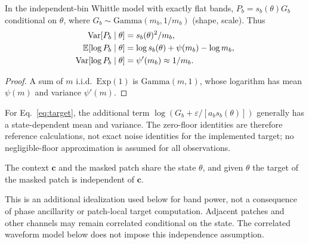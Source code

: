 \begin{proposition}\label{prop:var}
In the independent-bin Whittle model with exactly flat bands,
$P_b=s_b(\theta)G_b$ conditional on $\theta$, where
$G_b\sim\mathrm{Gamma}(m_b,1/m_b)$ (shape, scale). Thus
\begin{align*}
\operatorname{Var}[P_b\mid\theta]&=s_b(\theta)^2/m_b,\\
\mathbb{E}[\log P_b\mid\theta]&=\log s_b(\theta)+\psi(m_b)-\log m_b,\\
\operatorname{Var}[\log P_b\mid\theta]&=\psi'(m_b)\approx1/m_b.
\end{align*}
\end{proposition}
\begin{proof}
A sum of $m$ i.i.d.\ $\mathrm{Exp}(1)$ is $\mathrm{Gamma}(m,1)$, whose logarithm has mean
$\psi(m)$ and variance $\psi'(m)$.
\end{proof}
\noindent For Eq.~\eqref{eq:target}, the additional term
$\log(G_b+\varepsilon/[a_bs_b(\theta)])$ generally has a state-dependent mean and variance.
The zero-floor identities are therefore reference calculations, not exact noise identities
for the implemented target; no negligible-floor approximation is assumed for all observations.

\begin{assumption}\label{as:persist}
The context $\bm{c}$ and the masked patch share the state $\theta$, and given $\theta$ the
target of the masked patch is independent of $\bm{c}$.
\end{assumption}
\noindent This is an additional idealization used below for band power, not a consequence of
phase ancillarity or patch-local target computation. Adjacent patches and other channels may
remain correlated conditional on the state. The correlated waveform model below does not
impose this independence assumption.


